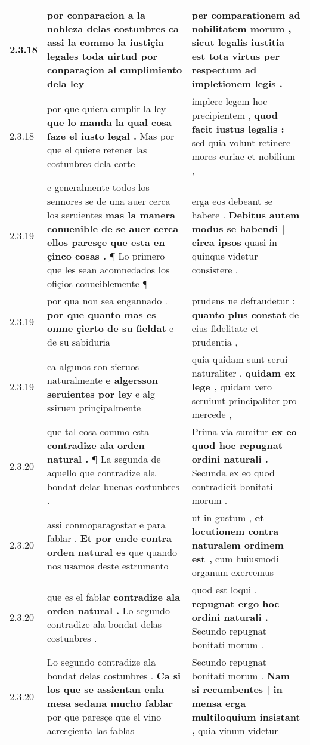 \begin{tabular}{|p{1cm}|p{6.5cm}|p{6.5cm}|}
2.3.18 & por conparacion a la nobleza delas costunbres \textbf{ ca assi la commo la iustiçia legales toda uirtud } por conparaçion al cunplimiento dela ley & per comparationem ad nobilitatem morum , \textbf{ sicut legalis iustitia est tota virtus } per respectum ad impletionem legis . \\\hline
2.3.18 & por que quiera cunplir la ley \textbf{ que lo manda la qual cosa faze el iusto legal . } Mas por que el quiere retener las costunbres dela corte & implere legem hoc precipientem , \textbf{ quod facit iustus legalis : } sed quia volunt retinere mores curiae et nobilium , \\\hline
2.3.19 & e generalmente todos los sennores se de una auer cerca los seruientes \textbf{ mas la manera conuenible de se auer cerca ellos paresçe que esta en çinco cosas . } ¶ Lo primero que les sean acomnedados los ofiçios conueiblemente ¶ & erga eos debeant se habere . \textbf{ Debitus autem modus se habendi | circa ipsos } quasi in quinque videtur consistere . \\\hline
2.3.19 & por qua non sea engannado . \textbf{ por que quanto mas es omne çierto de su fieldat } e de su sabiduria & prudens ne defraudetur : \textbf{ quanto plus constat } de eius fidelitate et prudentia , \\\hline
2.3.19 & ca algunos son sieruos naturalmente \textbf{ e algersson seruientes por ley } e alg ssiruen prinçipalmente & quia quidam sunt serui naturaliter , \textbf{ quidam ex lege , } quidam vero seruiunt principaliter pro mercede , \\\hline
2.3.20 & que tal cosa commo esta \textbf{ contradize ala orden natural . } ¶ La segunda de aquello que contradize ala bondat delas buenas costunbres . & Prima via sumitur \textbf{ ex eo quod hoc repugnat ordini naturali . } Secunda ex eo quod contradicit bonitati morum . \\\hline
2.3.20 & assi conmoparagostar e para fablar . \textbf{ Et por ende contra orden natural es } que quando nos usamos deste estrumento & ut in gustum , \textbf{ et locutionem contra naturalem ordinem est , } cum huiusmodi organum exercemus \\\hline
2.3.20 & que es el fablar \textbf{ contradize ala orden natural . } Lo segundo contradize ala bondat delas costunbres . & quod est loqui , \textbf{ repugnat ergo hoc ordini naturali . } Secundo repugnat bonitati morum . \\\hline
2.3.20 & Lo segundo contradize ala bondat delas costunbres . \textbf{ Ca si los que se assientan enla mesa sedana mucho fablar } por que paresçe que el vino acresçienta las fablas & Secundo repugnat bonitati morum . \textbf{ Nam si recumbentes | in mensa erga multiloquium insistant , } quia vinum videtur \\\hline

\end{tabular}
